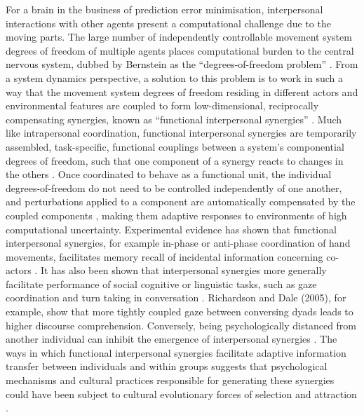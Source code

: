 For a brain in the business of prediction error minimisation, interpersonal interactions with other agents present a computational challenge due to the moving parts.  The large number of independently controllable movement system degrees of freedom of multiple agents places computational burden to the central nervous system, dubbed by Bernstein \textcite{Bernstein1967} as the ``degrees-of-freedom problem'' \citep[see also][]{Turvey1982,Turvey1990}.  From a system dynamics perspective, a solution to this problem is to work in such a way that the movement system degrees of freedom residing in different actors and environmental features are coupled to form low-dimensional, reciprocally compensating synergies, known as ``functional interpersonal synergies'' \citep{Riley2011}.
Much like intrapersonal coordination, functional interpersonal synergies are temporarily assembled, task-specific, functional couplings between a system's componential degrees of freedom, such that one component of a synergy reacts to changes in the others \citep{Kelso2009}.  Once coordinated to behave as a functional unit, the individual degrees-of-freedom do not need to be controlled independently of one another, and perturbations applied to a component are automatically compensated by the coupled components \citep{Kelso1984,Latash2002,Riley2011}, making them adaptive responses to environments of high computational uncertainty.
Experimental evidence has shown that functional interpersonal synergies, for example in-phase or anti-phase coordination of hand movements, facilitates memory recall of incidental information concerning co-actors \citep{Miles2010}. It has also been shown that interpersonal synergies more generally facilitate performance of social cognitive or linguistic tasks, such as gaze coordination and turn taking in conversation \citep{Richardson2005,Shockley2009}.  Richardson and Dale (2005), for example, show that more tightly coupled gaze between conversing dyads leads to higher discourse comprehension.  Conversely, being psychologically distanced from another individual can inhibit the emergence of interpersonal synergies \citep{Miles2010}.  The ways in which functional interpersonal synergies facilitate adaptive information transfer between individuals and within groups suggests that psychological mechanisms and cultural practices responsible for generating these synergies could have been subject to cultural evolutionary forces of selection and attraction \citep{Claidiere2014,Mesoudi2016a}.


